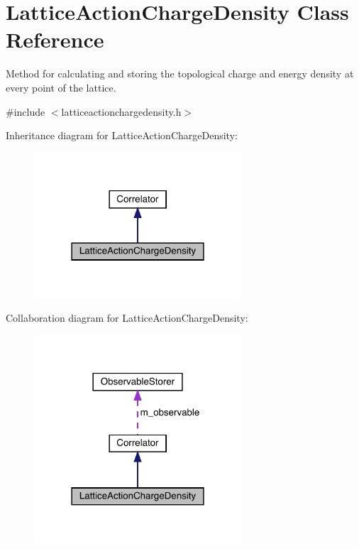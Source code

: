 \hypertarget{class_lattice_action_charge_density}{}\section{Lattice\+Action\+Charge\+Density Class Reference}
\label{class_lattice_action_charge_density}


Method for calculating and storing the topological charge and energy density at every point of the lattice.  




{\ttfamily \#include $<$latticeactionchargedensity.\+h$>$}



Inheritance diagram for Lattice\+Action\+Charge\+Density\+:
\nopagebreak
\begin{figure}[H]
\begin{center}
\leavevmode
\includegraphics[width=219pt]{class_lattice_action_charge_density__inherit__graph}
\end{center}
\end{figure}


Collaboration diagram for Lattice\+Action\+Charge\+Density\+:
\nopagebreak
\begin{figure}[H]
\begin{center}
\leavevmode
\includegraphics[width=219pt]{class_lattice_action_charge_density__coll__graph}
\end{center}
\end{figure}
